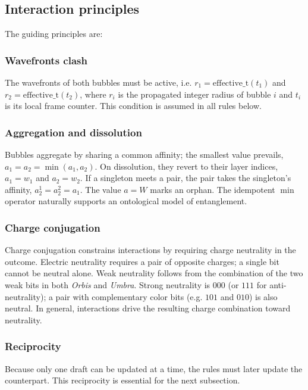 \documentclass{ijuc}
\begin{document}
\subsection{Interaction principles}
The guiding principles are:

\subsubsection{Wavefronts clash}
The wavefronts of both bubbles must be active, i.e. $r_1 = \mathrm{effective\_t}(t_1)$ and $r_2 = \mathrm{effective\_t}(t_2)$, where $r_i$ is the propagated integer radius of bubble $i$ and $t_i$ is its local frame counter. This condition is assumed in all rules below.

\subsubsection{Aggregation and dissolution}\label{subsec-role-of-affinity}

Bubbles aggregate by sharing a common affinity; the smallest value prevails, $a_1=a_2=\min(a_1,a_2)$. On dissolution, they revert to their layer indices, $a_1=w_1$ and $a_2=w_2$. If a singleton meets a pair, the pair takes the singleton's affinity, $a_2^1=a_2^2=a_1$. The value $a=W$ marks an orphan. The idempotent $\min$ operator naturally supports an ontological model of entanglement.

\subsubsection{Charge conjugation}

Charge conjugation constrains interactions by requiring charge neutrality in the outcome. Electric neutrality requires a pair of opposite charges; a single bit cannot be neutral alone. Weak neutrality follows from the combination of the two weak bits in both \textit{Orbis} and \textit{Umbra}. Strong neutrality is $000$ (or $111$ for anti-neutrality); a pair with complementary color bits (e.g. $101$ and $010$) is also neutral. In general, interactions drive the resulting charge combination toward neutrality.

\subsubsection{Reciprocity}
Because only one draft can be updated at a time, the rules must later update the counterpart. This reciprocity is essential for the next subsection.
\end{document}
